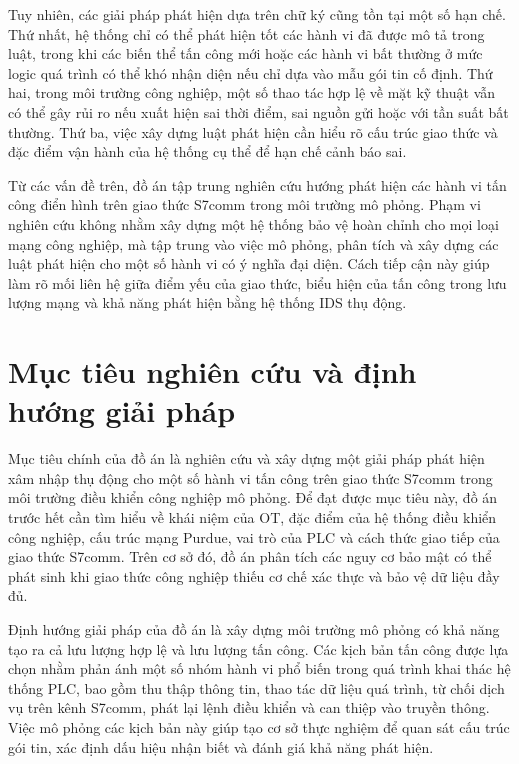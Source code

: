 \documentclass[../main.tex]{subfiles}
\begin{document}
Tuy nhiên, các giải pháp phát hiện dựa trên chữ ký cũng tồn tại một số hạn chế. Thứ nhất, hệ thống chỉ có thể phát hiện tốt các hành vi đã được mô tả trong luật, trong khi các biến thể tấn công mới hoặc các hành vi bất thường ở mức logic quá trình có thể khó nhận diện nếu chỉ dựa vào mẫu gói tin cố định. Thứ hai, trong môi trường công nghiệp, một số thao tác hợp lệ về mặt kỹ thuật vẫn có thể gây rủi ro nếu xuất hiện sai thời điểm, sai nguồn gửi hoặc với tần suất bất thường. Thứ ba, việc xây dựng luật phát hiện cần hiểu rõ cấu trúc giao thức và đặc điểm vận hành của hệ thống cụ thể để hạn chế cảnh báo sai.

Từ các vấn đề trên, đồ án tập trung nghiên cứu hướng phát hiện các hành vi tấn công điển hình trên giao thức S7comm trong môi trường mô phỏng. Phạm vi nghiên cứu không nhằm xây dựng một hệ thống bảo vệ hoàn chỉnh cho mọi loại mạng công nghiệp, mà tập trung vào việc mô phỏng, phân tích và xây dựng các luật phát hiện cho một số hành vi có ý nghĩa đại diện. Cách tiếp cận này giúp làm rõ mối liên hệ giữa điểm yếu của giao thức, biểu hiện của tấn công trong lưu lượng mạng và khả năng phát hiện bằng hệ thống IDS thụ động.

\section{Mục tiêu nghiên cứu và định hướng giải pháp}

Mục tiêu chính của đồ án là nghiên cứu và xây dựng một giải pháp phát hiện xâm nhập thụ động cho một số hành vi tấn công trên giao thức S7comm trong môi trường điều khiển công nghiệp mô phỏng. Để đạt được mục tiêu này, đồ án trước hết cần tìm hiểu về khái niệm của OT, đặc điểm của hệ thống điều khiển công nghiệp, cấu trúc mạng Purdue, vai trò của PLC và cách thức giao tiếp của giao thức S7comm. Trên cơ sở đó, đồ án phân tích các nguy cơ bảo mật có thể phát sinh khi giao thức công nghiệp thiếu cơ chế xác thực và bảo vệ dữ liệu đầy đủ.

Định hướng giải pháp của đồ án là xây dựng môi trường mô phỏng có khả năng tạo ra cả lưu lượng hợp lệ và lưu lượng tấn công. Các kịch bản tấn công được lựa chọn nhằm phản ánh một số nhóm hành vi phổ biến trong quá trình khai thác hệ thống PLC, bao gồm thu thập thông tin, thao tác dữ liệu quá trình, từ chối dịch vụ trên kênh S7comm, phát lại lệnh điều khiển và can thiệp vào truyền thông. Việc mô phỏng các kịch bản này giúp tạo cơ sở thực nghiệm để quan sát cấu trúc gói tin, xác định dấu hiệu nhận biết và đánh giá khả năng phát hiện.
\end{document}
